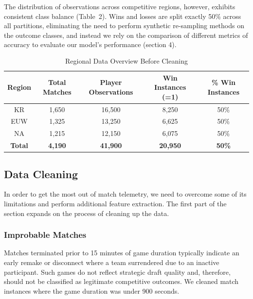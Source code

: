 \documentclass[11pt,letterpaper]{article}
\begin{document}
\clearpage

The distribution of observations across competitive regions, however, exhibits consistent class balance (Table~2). Wins and losses are split exactly 50\% across all partitions, eliminating the need to perform synthetic re-sampling methods on the outcome classes, and instead we rely on the comparison of different metrics of accuracy to evaluate our model's performance (section 4).

\begin{table}[h]
\centering
\caption{Regional Data Overview Before Cleaning}
\label{tab:before_cleaning}
\small
\begin{tabular}{ccccc}
\toprule
\textbf{Region} & \textbf{Total Matches} & \textbf{Player Observations} & \textbf{Win Instances (=1)} & \textbf{\% Win Instances} \\
\midrule
KR & 1,650 & 16,500 & 8,250 & 50\% \\
EUW & 1,325 & 13,250 & 6,625 & 50\% \\
NA & 1,215 & 12,150 & 6,075 & 50\% \\
\midrule
\textbf{Total} & \textbf{4,190} & \textbf{41,900} & \textbf{20,950} & \textbf{50\%} \\
\bottomrule
\end{tabular}
\end{table}

\subsection{Data Cleaning}

In order to get the most out of match telemetry, we need to overcome some of its limitations and perform additional feature extraction. The first part of the section expands on the process of cleaning up the data.

\subsubsection{Improbable Matches}

Matches terminated prior to 15 minutes of game duration typically indicate an early remake or disconnect where a team surrendered due to an inactive participant. Such games do not reflect strategic draft quality and, therefore, should not be classified as legitimate competitive outcomes. We cleaned match instances where the game duration was under 900 seconds.
\end{document}
